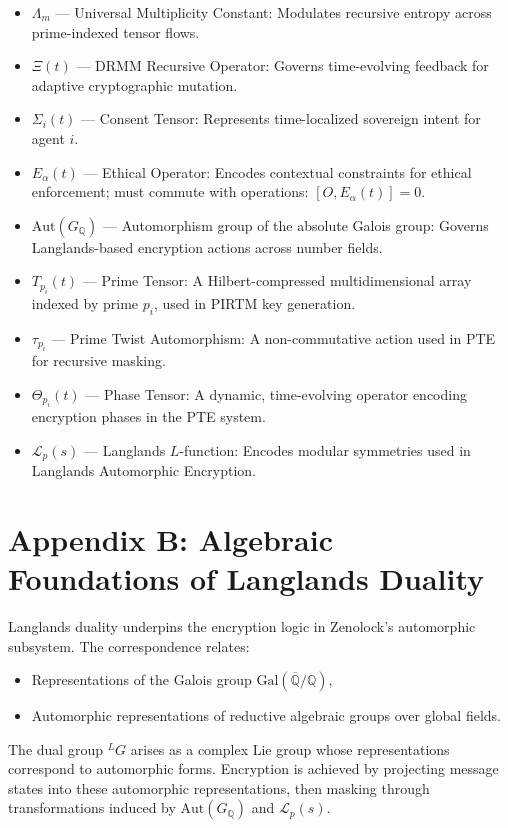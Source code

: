 \documentclass{article}
\theoremstyle{plain}
\begin{document}
\begin{itemize}
  \item $\Lambda_m$ — Universal Multiplicity Constant: Modulates recursive entropy across prime-indexed tensor flows.
  \item $\Xi(t)$ — DRMM Recursive Operator: Governs time-evolving feedback for adaptive cryptographic mutation.
  \item $\Sigma_i(t)$ — Consent Tensor: Represents time-localized sovereign intent for agent $i$.
  \item $E_\alpha(t)$ — Ethical Operator: Encodes contextual constraints for ethical enforcement; must commute with operations: $[O, E_\alpha(t)] = 0$.
  \item $\text{Aut}(G_{\mathbb{Q}})$ — Automorphism group of the absolute Galois group: Governs Langlands-based encryption actions across number fields.
  \item $T_{p_i}(t)$ — Prime Tensor: A Hilbert-compressed multidimensional array indexed by prime $p_i$, used in PIRTM key generation.
  \item $\tau_{p_i}$ — Prime Twist Automorphism: A non-commutative action used in PTE for recursive masking.
  \item $\Theta_{p_i}(t)$ — Phase Tensor: A dynamic, time-evolving operator encoding encryption phases in the PTE system.
  \item $\mathcal{L}_p(s)$ — Langlands $L$-function: Encodes modular symmetries used in Langlands Automorphic Encryption.
\end{itemize}

\section{Appendix B: Algebraic Foundations of Langlands Duality}

Langlands duality underpins the encryption logic in Zenolock’s automorphic subsystem. The correspondence relates:
\begin{itemize}
  \item Representations of the Galois group $\text{Gal}(\overline{\mathbb{Q}}/\mathbb{Q})$,
  \item Automorphic representations of reductive algebraic groups over global fields.
\end{itemize}

The dual group $^LG$ arises as a complex Lie group whose representations correspond to automorphic forms. Encryption is achieved by projecting message states into these automorphic representations, then masking through transformations induced by $\text{Aut}(G_{\mathbb{Q}})$ and $\mathcal{L}_p(s)$.
\end{document}
